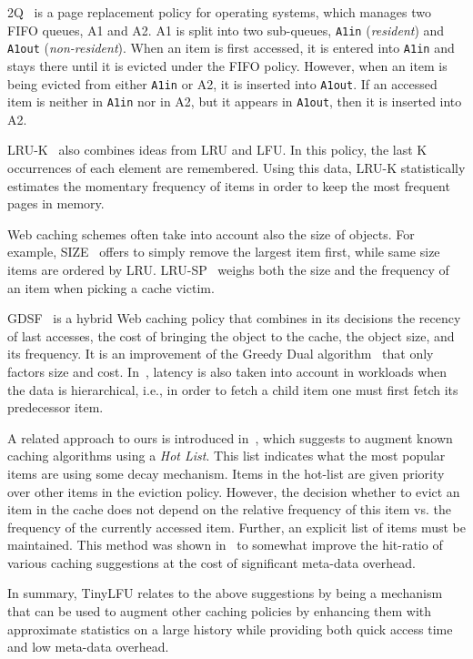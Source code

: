 \documentclass[10pt,a4paper]{article}
\begin{document}
2Q~\cite{2Q} is a page replacement policy for operating systems, which manages two FIFO queues, A1 and A2.
A1 is split into two sub-queues, \texttt{A1in} (\emph{resident}) and \texttt{A1out} (\emph{non-resident}).
When an item is first accessed, it is entered into \texttt{A1in} and stays there until it is evicted under the FIFO policy.
However, when an item is being evicted from either \texttt{A1in} or A2, it is inserted into \texttt{A1out}.
If an accessed item is neither in \texttt{A1in} nor in A2, but it appears in \texttt{A1out}, then it is inserted into A2.

LRU-K~\cite{LRUK} also combines ideas from LRU and LFU.
In this policy, the last K occurrences of each element are remembered.
Using this data, LRU-K statistically estimates the momentary frequency of items in order to keep the most frequent pages in memory.

Web caching schemes often take into account also the size of objects.
For example, SIZE~\cite{SIZE} offers to simply remove the largest item first, while same size items are ordered by LRU.
LRU-SP~\cite{LruSP} weighs both the size and the frequency of an item when picking a cache victim.

GDSF~\cite{GDSF} is a hybrid Web caching policy that combines in its decisions the recency of last accesses, the cost of bringing the object to the cache, the object size, and its frequency.
It is an improvement of the Greedy Dual algorithm~\cite{GD} that only factors size and cost. In~\cite{CORBA}, latency is also taken into account in workloads when the data is hierarchical, i.e., in order to fetch a child item one must first fetch its predecessor item.


A related approach to ours is introduced in~\cite{AdaptiveCacheReplacement}, which suggests to augment known caching algorithms using a \emph{Hot List}.
This list indicates what the most popular items are using some decay mechanism.
Items in the hot-list are given priority over other items in the eviction policy.
However, the decision whether to evict an item in the cache does not depend on the relative frequency of this item vs. the frequency of the currently accessed item.
Further, an explicit list of  items must be maintained.
This method was shown in~\cite{AdaptiveCacheReplacement} to somewhat improve the hit-ratio of various caching suggestions at the cost of significant meta-data overhead.

In summary, TinyLFU relates to the above suggestions by being a mechanism that can be used to augment other caching policies by enhancing them with approximate statistics on a large history while providing both quick access time and low meta-data overhead.
\end{document}
